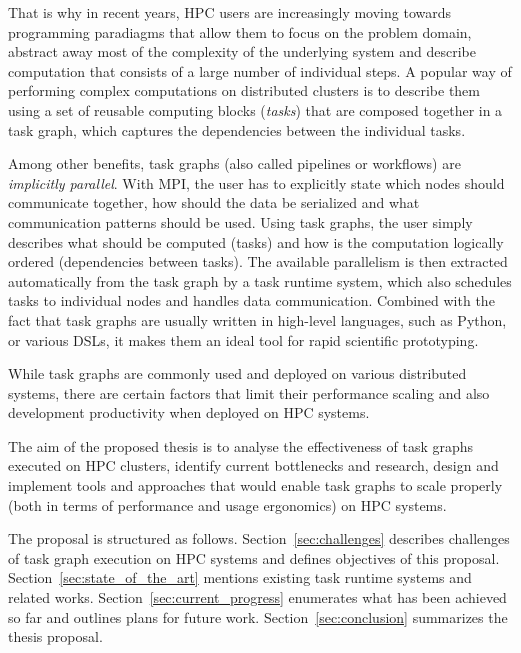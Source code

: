 That is why in recent years, HPC users are increasingly moving towards programming paradiagms that
allow them to focus on the problem domain, abstract away most of the complexity of the underlying
system and describe computation that consists of a large number of individual steps.
A popular way of performing complex computations on distributed clusters is to describe them
using a set of reusable computing blocks (\emph{tasks}) that are composed together in a task graph,
which captures the dependencies between the individual tasks.

Among other benefits, task graphs (also called pipelines or workflows) are \emph{implicitly parallel}.
With MPI, the user has to explicitly state which nodes should communicate together, how should the
data be serialized and what communication patterns should be used. Using task graphs, the user
simply describes what should be computed (tasks) and how is the computation logically ordered
(dependencies between tasks). The available parallelism is then extracted automatically from the
task graph by a task runtime system, which also schedules tasks to individual nodes and handles
data communication. Combined with the fact that task graphs are usually written in high-level languages,
such as Python, or various DSLs, it makes them an ideal tool for rapid scientific prototyping.

While task graphs are commonly used and deployed on various distributed systems, there are certain
factors that limit their performance scaling and also development productivity when deployed on HPC
systems.

The aim of the proposed thesis is to analyse the effectiveness of task graphs executed on HPC clusters,
identify current bottlenecks and research, design and implement tools and approaches that would
enable task graphs to scale properly (both in terms of performance and usage ergonomics) on HPC systems.

The proposal is structured as follows. Section~\ref{sec:challenges} describes challenges of task graph
execution on HPC systems and defines objectives of this proposal. Section~\ref{sec:state_of_the_art}
mentions existing task runtime systems and related works. Section~\ref{sec:current_progress} enumerates
what has been achieved so far and outlines plans for future work. Section~\ref{sec:conclusion}
summarizes the thesis proposal.
